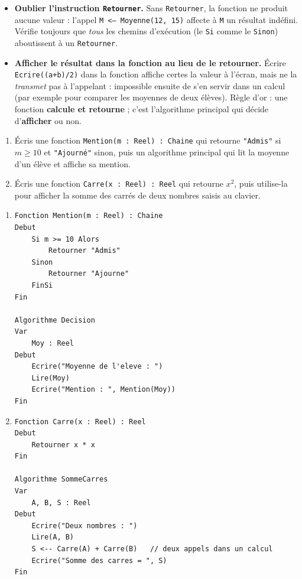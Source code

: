 \documentclass[11pt]{article}
\begin{document}
\begin{attention}
\begin{itemize}
\item \textbf{Oublier l'instruction \texttt{Retourner}.} Sans \texttt{Retourner}, la fonction ne produit aucune valeur : l'appel \texttt{M <-- Moyenne(12, 15)} affecte à \texttt{M} un résultat indéfini. Vérifie toujours que \emph{tous} les chemins d'exécution (le \texttt{Si} comme le \texttt{Sinon}) aboutissent à un \texttt{Retourner}.
\item \textbf{Afficher le résultat dans la fonction au lieu de le retourner.} Écrire \texttt{Ecrire((a+b)/2)} dans la fonction affiche certes la valeur à l'écran, mais ne la \emph{transmet} pas à l'appelant : impossible ensuite de s'en servir dans un calcul (par exemple pour comparer les moyennes de deux élèves). Règle d'or : une fonction \textbf{calcule et retourne} ; c'est l'algorithme principal qui décide d'\textbf{afficher} ou non.
\end{itemize}
\end{attention}

\begin{exercice}
\begin{enumerate}
\item Écris une fonction \texttt{Mention(m : Reel) : Chaine} qui retourne \texttt{"Admis"} si $m \geq 10$ et \texttt{"Ajourné"} sinon, puis un algorithme principal qui lit la moyenne d'un élève et affiche sa mention.
\item Écris une fonction \texttt{Carre(x : Reel) : Reel} qui retourne $x^2$, puis utilise-la pour afficher la somme des carrés de deux nombres saisis au clavier.
\end{enumerate}
\end{exercice}

\begin{corrige}[Exercice]
\begin{enumerate}
\item \begin{lstlisting}
Fonction Mention(m : Reel) : Chaine
Debut
    Si m >= 10 Alors
        Retourner "Admis"
    Sinon
        Retourner "Ajourne"
    FinSi
Fin

Algorithme Decision
Var
    Moy : Reel
Debut
    Ecrire("Moyenne de l'eleve : ")
    Lire(Moy)
    Ecrire("Mention : ", Mention(Moy))
Fin
\end{lstlisting}
\item \begin{lstlisting}
Fonction Carre(x : Reel) : Reel
Debut
    Retourner x * x
Fin

Algorithme SommeCarres
Var
    A, B, S : Reel
Debut
    Ecrire("Deux nombres : ")
    Lire(A, B)
    S <-- Carre(A) + Carre(B)   // deux appels dans un calcul
    Ecrire("Somme des carres = ", S)
Fin
\end{lstlisting}
\end{enumerate}
\end{corrige}
\end{document}
